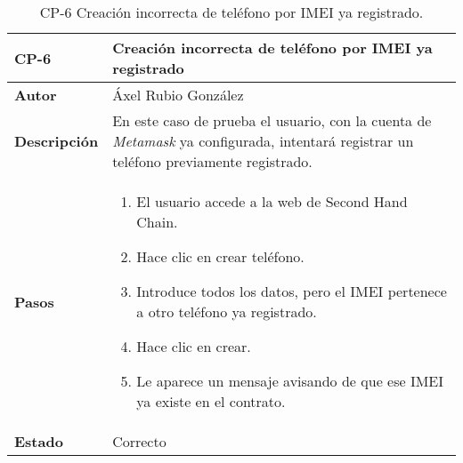 \begin{table}[p]
	\centering
	\begin{tabularx}{\linewidth}{ p{} p{} }
		\toprule
		\textbf{CP-6}    & \textbf{Creación incorrecta de teléfono por IMEI ya registrado}\\
		\toprule
		\textbf{Autor}                & Áxel Rubio González \\
		\textbf{Descripción}          & En este caso de prueba el usuario, con la cuenta de \textit{Metamask} ya configurada,  intentará registrar un teléfono previamente registrado. \\
		\textbf{Pasos}             &
		\begin{enumerate}
			\def\labelenumi{\arabic{enumi}.}
			\tightlist
			\item El usuario accede a la web de Second Hand Chain.
                \item Hace clic en crear teléfono.
                \item Introduce todos los datos, pero el IMEI pertenece a otro teléfono ya registrado.
                \item Hace clic en crear.
                \item Le aparece un mensaje avisando de que ese IMEI ya existe en el contrato.
		\end{enumerate}\\
		\textbf{Estado}          & Correcto \\
		\bottomrule
	\end{tabularx}
	\caption{CP-6 Creación incorrecta de teléfono por IMEI ya registrado.}
\end{table}

